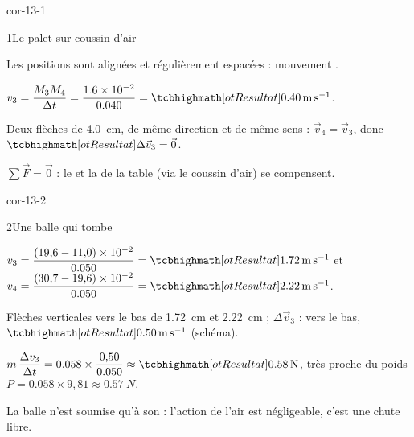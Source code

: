 \corrigesSouples

\begin{blocLivre}{cor-13-1}
\begin{corrige}{1}{Le palet sur coussin d'air}
\begin{questions}
\item Les positions sont alignées et régulièrement espacées : mouvement .
\item $v_3=\dfrac{M_3M_4}{\Delta t}=\dfrac{\num{1,6e-2}}{\num{0,040}}=\res{\qty{0,40}{m.s^{-1}}}$.
\item Deux flèches de \qty{4,0}{cm}, de même direction et de même sens : $\vec{v}_4=\vec{v}_3$, donc $\res{\Delta\vec{v}_3=\vec{0}}$.
\item $\sum\vec{F}=\vec{0}$ : le  et la  de la table (via le coussin d'air) se compensent.
\end{questions}
\end{corrige}
\end{blocLivre}
\begin{blocLivre}{cor-13-2}
\begin{corrige}{2}{Une balle qui tombe}
\begin{questions}
\item $v_3=\dfrac{(19{,}6-11{,}0)\times10^{-2}}{\num{0,050}}=\res{\qty{1,72}{m.s^{-1}}}$ et $v_4=\dfrac{(30{,}7-19{,}6)\times10^{-2}}{\num{0,050}}=\res{\qty{2,22}{m.s^{-1}}}$.
\item Flèches verticales vers le bas de \qty{1,72}{cm} et \qty{2,22}{cm} ; $\Delta\vec{v}_3$ : vers le bas, $\res{\qty{0,50}{m.s^{-1}}}$ (schéma).
\item $m\,\dfrac{\Delta v_3}{\Delta t}=\num{0,058}\times\dfrac{0{,}50}{\num{0,050}}\approx\res{\qty{0,58}{N}}$, très proche du poids $P=\num{0,058}\times9{,}81\approx\qty{0,57}{N}$.
\item La balle n'est soumise qu'à son  : l'action de l'air est négligeable, c'est une chute libre.
\end{questions}
\end{corrige}
\end{blocLivre}
